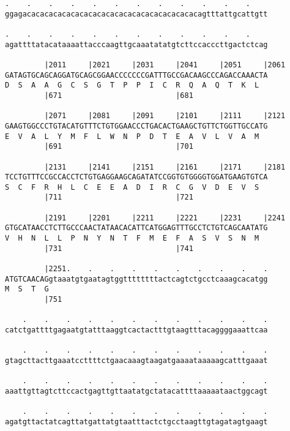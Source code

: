 \documentclass{article}
\begin{document}
\begin{Verbatim}
.    .    .    .    .    .    .    .    .    .    .    .    
ggagacacacacacacacacacacacacacacacacacacacacagtttattgcattgtt
                                                            
.    .    .    .    .    .    .    .    .    .    .    .    
agattttatacataaaattacccaagttgcaaatatatgtcttccacccttgactctcag
                                                            
         |2011     |2021     |2031     |2041     |2051     |2061
GATAGTGCAGCAGGATGCAGCGGAACCCCCCCGATTTGCCGACAAGCCCAGACCAAACTA
D  S  A  A  G  C  S  G  T  P  P  I  C  R  Q  A  Q  T  K  L  
         |671                          |681                 
  
         |2071     |2081     |2091     |2101     |2111     |2121
GAAGTGGCCCTGTACATGTTTCTGTGGAACCCTGACACTGAAGCTGTTCTGGTTGCCATG
E  V  A  L  Y  M  F  L  W  N  P  D  T  E  A  V  L  V  A  M  
         |691                          |701                 
  
         |2131     |2141     |2151     |2161     |2171     |2181
TCCTGTTTCCGCCACCTCTGTGAGGAAGCAGATATCCGGTGTGGGGTGGATGAAGTGTCA
S  C  F  R  H  L  C  E  E  A  D  I  R  C  G  V  D  E  V  S  
         |711                          |721                 
  
         |2191     |2201     |2211     |2221     |2231     |2241
GTGCATAACCTCTTGCCCAACTATAACACATTCATGGAGTTTGCCTCTGTCAGCAATATG
V  H  N  L  L  P  N  Y  N  T  F  M  E  F  A  S  V  S  N  M  
         |731                          |741                 
  
         |2251.    .    .    .    .    .    .    .    .    .
ATGTCAACAGgtaaatgtgaatagtggttttttttactcagtctgcctcaaagcacatgg
M  S  T  G                                                  
         |751                                               
  
    .    .    .    .    .    .    .    .    .    .    .    .
catctgattttgagaatgtatttaaggtcactactttgtaagtttacaggggaaattcaa
                                                            
    .    .    .    .    .    .    .    .    .    .    .    .
gtagcttacttgaaatccttttctgaacaaagtaagatgaaaataaaaagcatttgaaat
                                                            
    .    .    .    .    .    .    .    .    .    .    .    .
aaattgttagtcttccactgagttgttaatatgctatacattttaaaaataactggcagt
                                                            
    .    .    .    .    .    .    .    .    .    .    .    .
agatgttactatcagttatgattatgtaatttactctgcctaagttgtagatagtgaagt
                                                            

\end{Verbatim}
\end{document}

